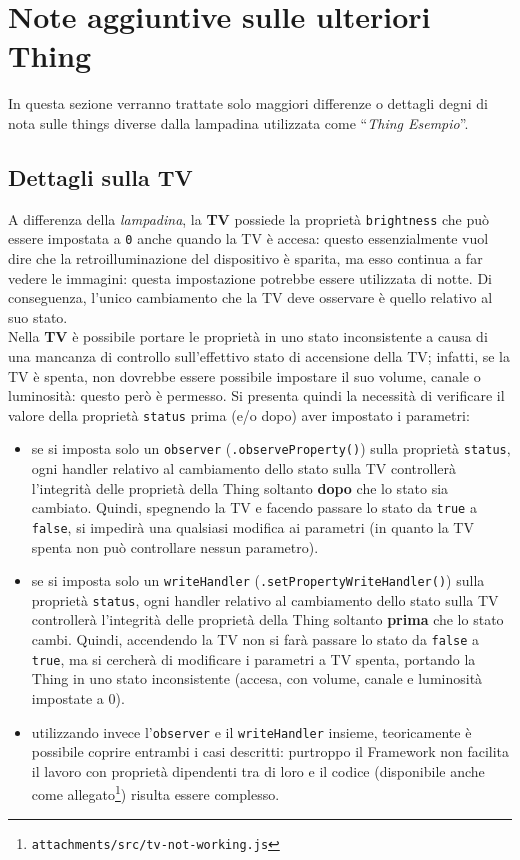 \documentclass[12pt,a4paper,openright,oneside]{report}
\newcommand{\quotes}[1]{``#1''}
\begin{document}
\section{Note aggiuntive sulle ulteriori Thing}
\label{sec:other-things}
In questa sezione verranno trattate solo maggiori differenze o dettagli degni di nota sulle things diverse dalla lampadina utilizzata come \quotes{\textit{Thing Esempio}}.


\subsection{Dettagli sulla TV}
A differenza della \textit{lampadina}, la \textbf{TV} possiede la proprietà \texttt{brightness} che può essere impostata a \texttt{0} anche quando la TV è accesa: questo essenzialmente vuol dire che la retroilluminazione del dispositivo è sparita, ma esso continua a far vedere le immagini: questa impostazione potrebbe essere utilizzata di notte. Di conseguenza, l'unico cambiamento che la TV deve osservare è quello relativo al suo stato.\\

Nella \textbf{TV} è possibile portare le proprietà in uno stato inconsistente a causa di una mancanza di controllo sull'effettivo stato di accensione della TV; infatti, se la TV è spenta, non dovrebbe essere possibile impostare il suo volume, canale o luminosità: questo però è permesso. Si presenta quindi la necessità di verificare il valore della proprietà \texttt{status} prima (e/o dopo) aver impostato i parametri:

\begin{itemize}
	\item se si imposta solo un \texttt{observer} (\texttt{.observeProperty()}) sulla proprietà \texttt{status}, ogni handler relativo al cambiamento dello stato sulla TV controllerà l'integrità delle proprietà della Thing soltanto \textbf{dopo} che lo stato sia cambiato. Quindi, spegnendo la TV e facendo passare lo stato da \texttt{true} a \texttt{false}, si impedirà una qualsiasi modifica ai parametri (in quanto la TV spenta non può controllare nessun parametro).
	
	\item se si imposta solo un \texttt{writeHandler} (\texttt{.setPropertyWriteHandler()}) sulla proprietà \texttt{status}, ogni handler relativo al cambiamento dello stato sulla TV controllerà l'integrità delle proprietà della Thing soltanto \textbf{prima} che lo stato cambi. Quindi, accendendo la TV non si farà passare lo stato da \texttt{false} a \texttt{true}, ma si cercherà di modificare i parametri a TV spenta, portando la Thing in uno stato inconsistente (accesa, con volume, canale e luminosità impostate a 0).
	
	\item utilizzando invece l'\texttt{observer} e il \texttt{writeHandler} insieme, teoricamente è possibile coprire entrambi i casi descritti: purtroppo il Framework non facilita il lavoro con proprietà dipendenti tra di loro e il codice (disponibile anche come allegato\footnote{\texttt{attachments/src/tv-not-working.js}}) risulta essere complesso.
\end{itemize}
\end{document}
